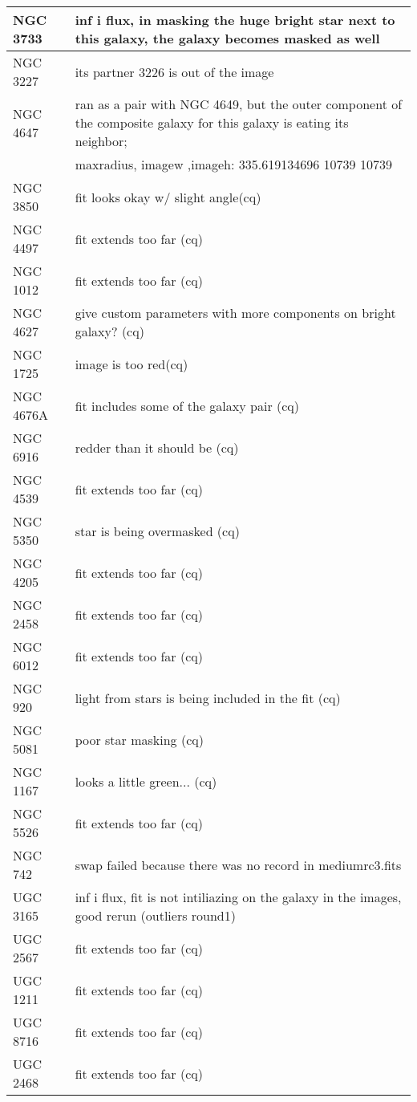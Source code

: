 \documentclass[10pt]{article}
\begin{document}
\begin{landscape}
\begin{longtable}{|l|l|}
NGC 3733 & inf i flux, in masking the huge bright star next to this galaxy, the galaxy becomes masked as well \\ \hline
NGC 3227 & its partner 3226 is out of the image\\ \hline
NGC 4647 & ran as a pair with NGC 4649, but the outer component of the composite galaxy for this galaxy is eating its neighbor;\\ \hline
 & maxradius, imagew ,imageh: 335.619134696 10739 10739 \\ \hline
NGC 3850 & fit looks okay w/ slight angle(cq)\\ \hline
NGC 4497 & fit extends too far (cq)\\ \hline
NGC 1012 & fit extends too far (cq)\\ \hline
NGC 4627 & give custom parameters with more components on bright galaxy? (cq) \\ \hline
NGC 1725 & image is too red(cq) \\ \hline
NGC 4676A & fit includes some of the galaxy pair (cq) \\ \hline
NGC 6916 & redder than it should be (cq) \\ \hline
NGC 4539 & fit extends too far (cq) \\ \hline
NGC 5350 & star is being overmasked (cq) \\ \hline
NGC 4205 & fit extends too far (cq)\\ \hline
NGC 2458 & fit extends too far (cq)\\ \hline
NGC 6012 & fit extends too far (cq)\\ \hline
NGC 920 & light from stars is being included in the fit (cq)\\ \hline
NGC 5081 & poor star masking (cq)\\ \hline
NGC 1167 & looks a little green... (cq)\\ \hline
NGC 5526 & fit extends too far (cq)\\ \hline
NGC 742 & swap failed because there was no record in mediumrc3.fits \\ \hline
UGC 3165 & inf i flux, fit is not intiliazing on the galaxy in the images, good rerun (outliers round1)\\ \hline
UGC 2567 & fit extends too far (cq)\\ \hline
UGC 1211 & fit extends too far (cq)\\ \hline
UGC 8716 & fit extends too far (cq)\\ \hline
UGC 2468 & fit extends too far (cq)\\ \hline

\end{longtable}
\end{landscape}
\end{document}

